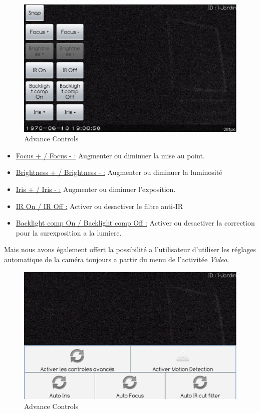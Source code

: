 \begin{figure}[H]
  \label{ctrl2}
  \centering
   \includegraphics[scale=0.4]{Images/ctrl2.eps}
  \caption{Advance Controls}
\end{figure}  
\begin{itemize}
  \item \underline{Focus + / Focus - :} Augmenter ou diminuer la mise au
  point.
  \item \underline{Brightness + / Brightness - :} Augmenter ou diminuer la luminosité
  \item \underline{Iris + / Iris - :} Augmenter ou diminuer l'exposition.
  \item \underline{IR On / IR Off :} Activer ou desactiver le filtre
  anti-IR
  \item \underline{Backlight comp On / Backlight comp Off :} Activer ou
  desactiver la correction pour la surexposition a la lumiere.
\end{itemize}
Mais nous avons également offert la possibilité a l'utilisateur d'utiliser les
réglages automatique de la caméra toujours a partir du menu de l'activitée
\textit{Video}.
\begin{figure}[H]
  \label{ctrl2}
  \centering
   \includegraphics[scale=0.4]{Images/ctrl1.eps}
  \caption{Advance Controls}
\end{figure}  

